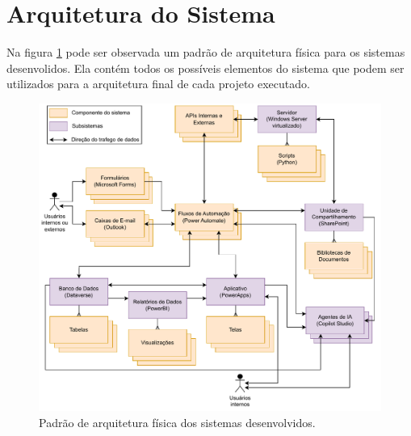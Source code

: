 	\section{Arquitetura do Sistema}

	Na figura \ref{fig:metodologia:arquiteturaFisica} pode ser observada um padrão de arquitetura física para os sistemas desenvolidos. Ela contém todos os possíveis
	elementos do sistema que podem ser utilizados para a arquitetura final de cada projeto executado. 
	\begin{figure}[h]
		\centering
		\includegraphics[width=1\textwidth]{./figuras/arquiteturaFisica.pdf}
		\caption{Padrão de arquitetura física dos sistemas desenvolvidos.}
		\label{fig:metodologia:arquiteturaFisica}
	\end{figure}

